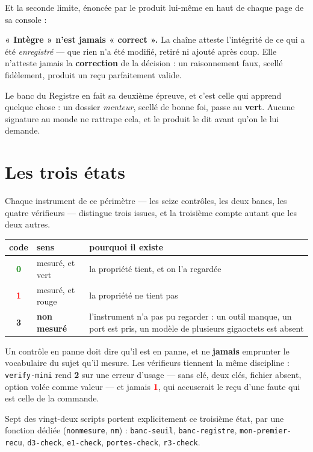 \documentclass[10pt]{report}
\newcommand{\code}[1]{\texttt{\small #1}}
\newcommand{\ok}[1]{\textcolor{green}{\textbf{#1}}}
\newcommand{\ko}[1]{\textcolor{red}{\textbf{#1}}}
\newcommand{\att}[1]{\textcolor{amber}{\textbf{#1}}}
\begin{document}
Et la seconde limite, énoncée par le produit lui-même en haut de chaque page de sa console :

\begin{these}
\textbf{« Intègre » n'est jamais « correct ».} La chaîne atteste l'intégrité de ce qui a été
\emph{enregistré} --- que rien n'a été modifié, retiré ni ajouté après coup. Elle n'atteste jamais
la \textbf{correction} de la décision : un raisonnement faux, scellé fidèlement, produit un reçu
parfaitement valide.
\end{these}

Le banc du Registre en fait sa deuxième épreuve, et c'est celle qui apprend quelque chose : un
dossier \emph{menteur}, scellé de bonne foi, passe au \textbf{vert}. Aucune signature au monde ne
rattrape cela, et le produit le dit avant qu'on le lui demande.

\section{Les trois états}

Chaque instrument de ce périmètre --- les seize contrôles, les deux bancs, les quatre vérifieurs ---
distingue trois issues, et la troisième compte autant que les deux autres.

\begin{longtable}{@{}c p{4.4cm} p{9.2cm}@{}}
\toprule \textbf{code} & \textbf{sens} & \textbf{pourquoi il existe} \\ \midrule \endhead
\ok{0} & mesuré, et vert & la propriété tient, et on l'a regardée \\
\ko{1} & mesuré, et rouge & la propriété ne tient pas \\
\att{3} & \textbf{non mesuré} & l'instrument n'a pas pu regarder : un outil manque, un port est pris, un modèle de plusieurs gigaoctets est absent \\
\bottomrule
\end{longtable}

\begin{acquis}
Un contrôle en panne doit dire qu'il est en panne, et ne \textbf{jamais} emprunter le vocabulaire
du sujet qu'il mesure. Les vérifieurs tiennent la même discipline : \code{verify-mini} rend
\att{2} sur une erreur d'usage --- sans clé, deux clés, fichier absent, option volée comme valeur
--- et jamais \ko{1}, qui accuserait le reçu d'une faute qui est celle de la commande.
\end{acquis}

Sept des vingt-deux scripts portent explicitement ce troisième état, par une fonction dédiée
(\code{nonmesure}, \code{nm}) : \code{banc-seuil}, \code{banc-registre}, \code{mon-premier-recu},
\code{d3-check}, \code{e1-check}, \code{portes-check}, \code{r3-check}.
\end{document}
